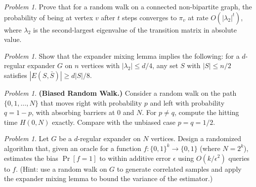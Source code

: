 \documentclass[twoside,12pt]{book}
\theoremstyle{plain}
\theoremstyle{definition}
\theoremstyle{remark}
\newtheorem{problem}[theorem]{Problem}
\begin{document}
\begin{problem}
Prove that for a random walk on a connected non-bipartite graph, the
probability of being at vertex $v$ after $t$ steps converges to $\pi_v$
at rate $O(|\lambda_2|^t)$, where $\lambda_2$ is the second-largest
eigenvalue of the transition matrix in absolute value.
\end{problem}

\begin{problem}
Show that the expander mixing lemma implies the following: for a
$d$-regular expander $G$ on $n$ vertices with $|\lambda_2| \leq d/4$, any
set $S$ with $|S| \leq n/2$ satisfies $|E(S, \bar{S})| \geq
d|S|/8$.
\end{problem}

\begin{problem}
\textbf{(Biased Random Walk.)} Consider a random walk on the path
$\{0, 1, \ldots, N\}$ that moves right with probability $p$ and left
with probability $q = 1 - p$, with absorbing barriers at $0$ and $N$.
For $p \neq q$, compute the hitting time $H(0, N)$ exactly. Compare with
the unbiased case $p = q = 1/2$.
\end{problem}

\begin{problem}
Let $G$ be a $d$-regular expander on $N$ vertices. Design a randomized
algorithm that, given an oracle for a function $f : \{0,1\}^k \to
\{0,1\}$ (where $N = 2^k$), estimates the bias $\Pr[f = 1]$ to within
additive error $\epsilon$ using $O(k/\epsilon^2)$ queries to $f$.
(Hint: use a random walk on $G$ to generate correlated samples and apply
the expander mixing lemma to bound the variance of the estimator.)
\end{problem}
\end{document}
